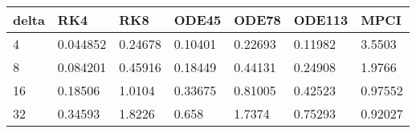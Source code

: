 \begin{tabular}{lllllll}
delta & RK4 & RK8 & ODE45 & ODE78 & ODE113 & MPCI \\ 
\hline 
4 & 0.044852 & 0.24678 & 0.10401 & 0.22693 & 0.11982 & 3.5503 \\ 
8 & 0.084201 & 0.45916 & 0.18449 & 0.44131 & 0.24908 & 1.9766 \\ 
16 & 0.18506 & 1.0104 & 0.33675 & 0.81005 & 0.42523 & 0.97552 \\ 
32 & 0.34593 & 1.8226 & 0.658 & 1.7374 & 0.75293 & 0.92027 \\ 
\hline 
\end{tabular}
